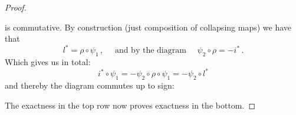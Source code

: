 \begin{proof}
\begin{center}
\begin{tikzcd}
		\end{tikzcd}
	\end{center} is commutative. By construction (just composition of collapsing maps) we have that 
	\begin{equation*}
		l^*=\rho \circ {\psi}_1\,,\quad  \text{ and by the diagram } \quad {\psi}_2\circ \rho  =- i^*\,.
	\end{equation*}
	 Which gives us in total:
	 \begin{equation*}
		i^*\circ {\psi}_1=-{\psi}_2 \circ \rho \circ {\psi}_1=-{\psi}_2 \circ l^* 
	 \end{equation*} and thereby the diagram commutes up to sign:
	\begin{center}
	\end{center} The exactness in the top row now proves exactness in the bottom.
\end{proof}

